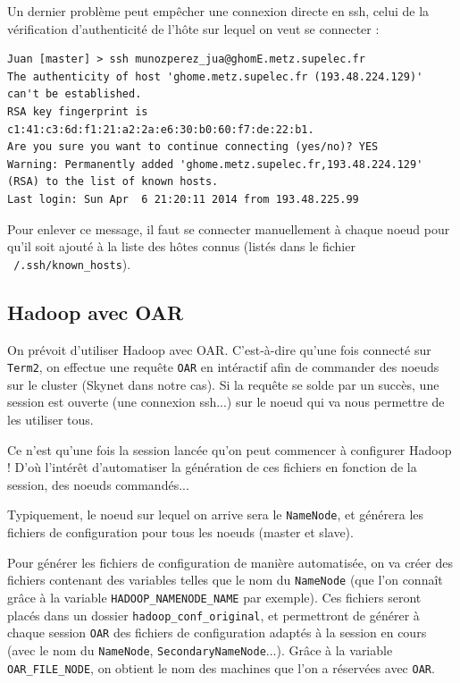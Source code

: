 \par Un dernier problème peut empêcher une connexion directe en ssh, celui de la vérification d'authenticité de l'hôte sur lequel on veut se connecter : 
\begin{verbatim}
Juan [master] > ssh munozperez_jua@ghomE.metz.supelec.fr
The authenticity of host 'ghome.metz.supelec.fr (193.48.224.129)' 
can't be established.
RSA key fingerprint is c1:41:c3:6d:f1:21:a2:2a:e6:30:b0:60:f7:de:22:b1.
Are you sure you want to continue connecting (yes/no)? YES
Warning: Permanently added 'ghome.metz.supelec.fr,193.48.224.129' 
(RSA) to the list of known hosts.
Last login: Sun Apr  6 21:20:11 2014 from 193.48.225.99
\end{verbatim}

\par Pour enlever ce message, il faut se connecter manuellement à chaque noeud pour qu'il soit ajouté à la liste des hôtes connus (listés dans le fichier \texttt{~/.ssh/known\_hosts}).

\subsection{Hadoop avec OAR}
\label{sec:hadoop-avec-oar}

\par On prévoit d'utiliser Hadoop avec OAR. C'est-à-dire qu'une fois connecté sur \texttt{Term2}, on effectue une requête \texttt{OAR} en intéractif afin de commander des noeuds sur le cluster (Skynet dans notre cas). Si la requête se solde par un succès, une session est ouverte (une connexion ssh...) sur le noeud qui va nous permettre de les utiliser tous.

\par Ce n'est qu'une fois la session lancée qu'on peut commencer à configurer Hadoop ! D'où l'intérêt d'automatiser la génération de ces fichiers en fonction de la session, des noeuds commandés... 
\par Typiquement, le noeud sur lequel on arrive sera le \texttt{NameNode}, et générera les fichiers de configuration pour tous les noeuds (master et slave).

\par Pour générer les fichiers de configuration de manière automatisée, on va créer des fichiers contenant des variables telles que le nom du \texttt{NameNode} (que l'on connaît grâce à la variable \texttt{HADOOP\_NAMENODE\_NAME} par exemple). Ces fichiers seront placés dans un dossier \texttt{hadoop\_conf\_original}, et permettront de générer à chaque session \texttt{OAR} des fichiers de configuration adaptés à la session en cours (avec le nom du \texttt{NameNode}, \texttt{SecondaryNameNode}...). Grâce à la variable \texttt{OAR\_FILE\_NODE}, on obtient le nom des machines que l'on a réservées avec \texttt{OAR}.

